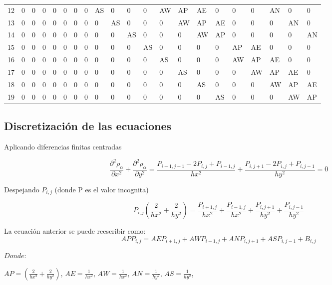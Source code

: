\documentclass[
  letterpaper,
  DIV=11,
  numbers=noendperiod]{scrreprt}
\begin{document}
\begin{longtable}[]{@{}lllllllllllllllllllll@{}}
12 & 0 & 0 & 0 & 0 & 0 & 0 & 0 & AS & 0 & 0 & 0 & AW & AP & AE & 0 & 0 &
0 & AN & 0 & 0 \\
13 & 0 & 0 & 0 & 0 & 0 & 0 & 0 & 0 & AS & 0 & 0 & 0 & AW & AP & AE & 0 &
0 & 0 & AN & 0 \\
14 & 0 & 0 & 0 & 0 & 0 & 0 & 0 & 0 & 0 & AS & 0 & 0 & 0 & AW & AP & 0 &
0 & 0 & 0 & AN \\
15 & 0 & 0 & 0 & 0 & 0 & 0 & 0 & 0 & 0 & 0 & AS & 0 & 0 & 0 & 0 & AP &
AE & 0 & 0 & 0 \\
16 & 0 & 0 & 0 & 0 & 0 & 0 & 0 & 0 & 0 & 0 & 0 & AS & 0 & 0 & 0 & AW &
AP & AE & 0 & 0 \\
17 & 0 & 0 & 0 & 0 & 0 & 0 & 0 & 0 & 0 & 0 & 0 & 0 & AS & 0 & 0 & 0 & AW
& AP & AE & 0 \\
18 & 0 & 0 & 0 & 0 & 0 & 0 & 0 & 0 & 0 & 0 & 0 & 0 & 0 & AS & 0 & 0 & 0
& AW & AP & AE \\
19 & 0 & 0 & 0 & 0 & 0 & 0 & 0 & 0 & 0 & 0 & 0 & 0 & 0 & 0 & AS & 0 & 0
& 0 & AW & AP \\
\end{longtable}

\subsection{Discretización de las
ecuaciones}\label{discretizaciuxf3n-de-las-ecuaciones}

Aplicando diferencias finitas centradas

\[\frac{\partial^2 \rho_\alpha}{\partial x^2}+ \frac{\partial^2\rho_\alpha}{\partial y^2} =
\frac{P_{i+1,j-1} - 2P_{i,j} + P_{i-1,j}}{hx^2}
+ \frac{P_{i,j+1} - 2P_{i,j} + P_{i,j-1}}{hy^2} = 0\]

Despejando \(P_{i,j}\) (donde P es el valor incognita)

\[P_{i,j}(\frac{2}{hx^2} + \frac{2}{hy^2})  
= \frac{P_{i+1,j}}{hx^2} + \frac{P_{i-1,j}}{hx^2} + \frac{P_{i,j+1}}{hy^2} + \frac{P_{i,j-1}}{hy^2}
\]

La ecuación anterior se puede reescribir como:
\[AP P_{i,j} = AE P_{i+1,j} + AW P_{i-1,j} + AN P_{i,j+1}
+ AS P_{i,j-1} + B_{i,j}\]

\(Donde:\)

\(AP = (\frac{2}{hx^2} + \frac{2}{hy^2})\), \(AE = \frac{1}{hx^2}\),
\(AW = \frac{1}{hx^2}\), \(AN = \frac{1}{hy^2}\),
\(AS = \frac{1}{hy^2}\),
\end{document}
